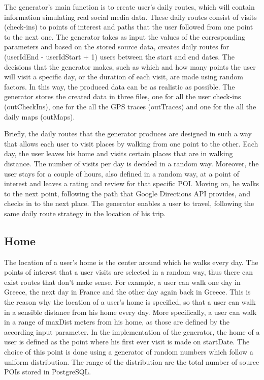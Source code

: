 The generator's main function is to create user's daily routes, which will contain information simulating real social media data. These daily routes 
consist of visits (check-ins) to points of interest and paths that the user followed from one point to the next one. The generator takes as input the 
values of the corresponding parameters and based on the stored source data, creates daily routes for (userIdEnd - userIdStart + 1) users between 
the start and end dates. The decisions that the generator makes, such as which and how many points the user will visit a specific day, or the duration 
of each visit, are made using random factors. In this way, the produced data can be as realistic as possible. The generator stores the created data in three files, 
one for all the user check-ins (outCheckIns), one for the all the GPS traces (outTraces) and one for the all the daily maps (outMaps).

Briefly, the daily routes that the generator produces are designed in such a way that allows each user to visit places by walking from one point to the other. 
Each day, the user leaves his home and visits certain places that are in walking distance. The number of visits per day is decided in a random way. Moreover, 
the user stays for a couple of hours, also defined in a random way, at a point of interest and leaves a rating and review for that specific POI. Moving on, he walks 
to the next point, following the path that Google Directions API provides, and checks in to the next place. The generator enables a user to travel, following the 
same daily route strategy in the location of his trip.


\subsection{Home}

The location of a user's home is the center around which he walks every day. The points of interest that a user visits are selected in a random way, thus there can 
exist routes that don't make sense. For example, a user can walk one day in Greece, the next day in France and the other day again back in Greece. This is the reason 
why the location of a user's home is specified, so that a user can walk in a sensible distance from his home every day. More specifically, a user can walk in a range 
of maxDist meters from his home, as those are defined by the according input parameter. In the implementation of the generator, the home of a user is defined as 
the point where his first ever visit is made on startDate. The choice of this point is done using a generator of random numbers which follow a uniform distribution. 
The range of the distribution are the total number of source POIs stored in PostgreSQL.

